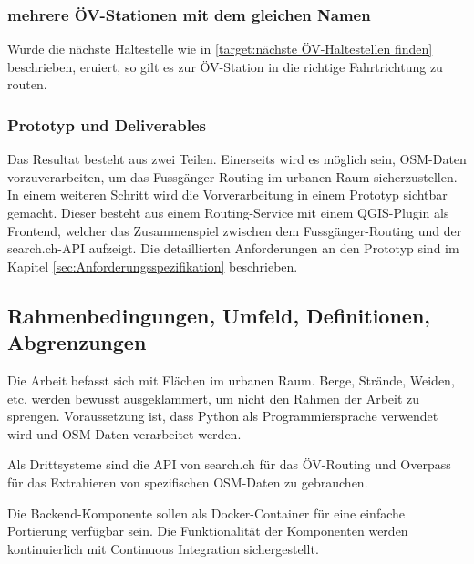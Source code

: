 \subsubsection{mehrere ÖV-Stationen mit dem gleichen Namen}
\label{target:mehrere ÖV-Stationen mit dem gleichen Namen}
Wurde die nächste Haltestelle wie in \ref{target:nächste ÖV-Haltestellen finden} beschrieben, eruiert, so gilt es zur ÖV-Station in die richtige Fahrtrichtung zu routen.

\subsubsection{Prototyp und Deliverables}
\label{target:Prototyp und Deliverables}
Das Resultat besteht aus zwei Teilen. Einerseits wird es möglich sein, \ac{OSM}-Daten vorzuverarbeiten, um das Fussgänger-Routing im urbanen Raum sicherzustellen. In einem weiteren Schritt wird die Vorverarbeitung in einem Prototyp sichtbar gemacht. Dieser besteht aus einem Routing-Service mit einem QGIS-Plugin als Frontend, welcher das Zusammenspiel zwischen dem Fussgänger-Routing und der search.ch-\ac{API} aufzeigt. Die detaillierten Anforderungen an den Prototyp sind im Kapitel \ref{sec:Anforderungsspezifikation} beschrieben.
	
\subsection{Rahmenbedingungen, Umfeld, Definitionen, Abgrenzungen}
\label{Rahmenbedingungen, Umfeld, Definitionen, Abgrenzungen}
Die Arbeit befasst sich mit Flächen im urbanen Raum. Berge, Strände, Weiden, etc. werden bewusst ausgeklammert, um nicht den Rahmen der Arbeit zu sprengen. Voraussetzung ist, dass Python als Programmiersprache verwendet wird und \ac{OSM}-Daten \cite{osm_data_switzerland} verarbeitet werden.

Als Drittsysteme sind die \ac{API} von search.ch \cite{search_ch_route_api} für das ÖV-Routing und Overpass \cite{wiki:overpass} für das Extrahieren von spezifischen \ac{OSM}-Daten zu gebrauchen.

Die Backend-Komponente sollen als Docker-Container für eine einfache Portierung verfügbar sein. Die Funktionalität der Komponenten werden kontinuierlich mit Continuous Integration sichergestellt.


